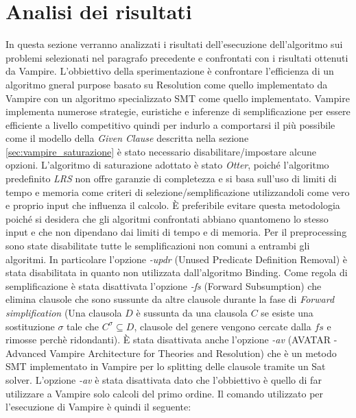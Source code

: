 \documentclass[./main.tex]{subfiles}
\begin{document}
\section{Analisi dei risultati}
In questa sezione verranno analizzati i risultati dell'esecuzione dell'algoritmo sui problemi selezionati nel paragrafo precedente
e confrontati con i risultati ottenuti da Vampire. 
L'obbiettivo della sperimentazione è confrontare l'efficienza di un algoritmo gneral purpose basato su Resolution come quello implementato da Vampire
con un algoritmo specializzato SMT come quello implementato.
Vampire implementa numerose strategie, euristiche e inferenze di semplificazione per essere efficiente a livello competitivo
quindi per indurlo a comportarsi il più possibile come il modello della \textit{Given Clause} descritta 
nella sezione \ref{sec:vampire_saturazione} è stato necessario disabilitare/impostare alcune opzioni.
L'algoritmo di saturazione adottato è stato \textit{Otter}, 
poiché l'algoritmo predefinito \textit{LRS} non offre garanzie di completezza e
si basa sull'uso di limiti di tempo e memoria come criteri di selezione/semplificazione 
utilizzandoli come vero e proprio input che influenza il calcolo. 
È preferibile evitare questa metodologia poiché si desidera che gli algoritmi confrontati abbiano quantomeno lo stesso input
e che non dipendano dai limiti di tempo e di memoria.
Per il preprocessing sono state disabilitate tutte le semplificazioni non comuni a entrambi gli algoritmi.
In particolare l'opzione \textit{-updr} (Unused Predicate Definition Removal) è stata disabilitata in quanto non utilizzata dall'algoritmo
Binding. 
Come regola di semplificazione è stata disattivata l'opzione \textit{-fs} (Forward Subsumption) che elimina 
clausole che sono sussunte da altre clausole durante la fase di \textit{Forward simplification} 
(Una clausola $D$ è sussunta da una clausola $C$ se esiste una sostituzione $\sigma$ tale che 
$C^\sigma \subseteq D$, clausole del genere vengono cercate dalla $fs$ e rimosse perchè ridondanti).
È stata disattivata anche l'opzione \textit{-av} (AVATAR - Advanced Vampire Architecture
for Theories and Resolution) che è un metodo SMT implementato in Vampire per lo splitting delle clausole tramite un Sat solver.
L'opzione \textit{-av} è stata disattivata dato che l'obbiettivo è quello di far utilizzare a Vampire solo calcoli del primo ordine.
Il comando utilizzato per l'esecuzione di Vampire è quindi il seguente:
\end{document}
